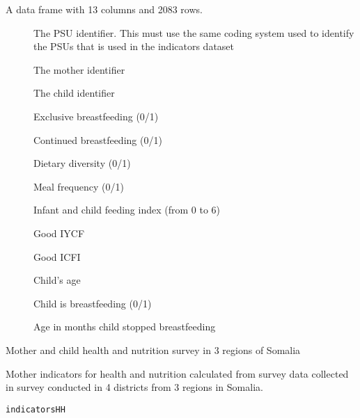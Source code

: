 \documentclass[a4paper]{book}
\begin{document}
\begin{Format}
A data frame with 13 columns and 2083 rows.
\begin{description}

\item[] The PSU identifier. This must use the same coding system
used to identify the PSUs that is used in the indicators dataset
\item[] The mother identifier
\item[] The child identifier
\item[] Exclusive breastfeeding (0/1)
\item[] Continued breastfeeding (0/1)
\item[] Dietary diversity (0/1)
\item[] Meal frequency (0/1)
\item[] Infant and child feeding index (from 0 to 6)
\item[] Good IYCF
\item[] Good ICFI
\item[] Child's age
\item[] Child is breastfeeding (0/1)
\item[] Age in months child stopped breastfeeding

\end{description}
\end{Format}
%
\begin{Source}\relax
Mother and child health and nutrition survey in 3 regions of Somalia
\end{Source}
%
\begin{Description}\relax
Mother indicators for health and nutrition calculated from survey data
collected in survey conducted in 4 districts from 3 regions in Somalia.
\end{Description}
%
\begin{Usage}
\begin{verbatim}
indicatorsHH
\end{verbatim}
\end{Usage}
%
\end{document}
